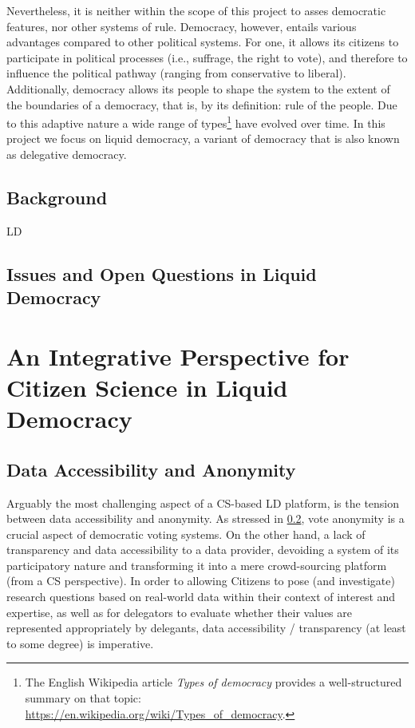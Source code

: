 Nevertheless, it is neither within the scope of this project to asses democratic features, nor other systems of rule. Democracy, however, entails various advantages compared to other political systems. For one, it allows its citizens to participate in political processes (i.e., suffrage, the right to vote), and therefore to influence the political pathway (ranging from conservative to liberal). Additionally, democracy allows its people to shape the system to the extent of the boundaries of a democracy, that is, by its definition: rule of the people. Due to this adaptive nature a wide range of types\footnote{The English Wikipedia article \textit{Types of democracy} provides a well-structured summary on that topic: \url{https://en.wikipedia.org/wiki/Types_of_democracy}.} have evolved over time. In this project we focus on liquid democracy, a variant of democracy that is also known as delegative democracy.


\subsection{Background}
\label{ssec:Background_LD}

\acrfull{LD} 

\subsection{Issues and Open Questions in Liquid Democracy}
\label{ssec:Issues_LD}
\section{An Integrative Perspective for Citizen Science in Liquid Democracy}
\label{sec:Integration_CSLD}

\subsection{Data Accessibility and Anonymity}
\label{ssec:Integration_AccessibilityAnonymity}
Arguably the most challenging aspect of a CS-based LD platform, is the tension between data accessibility and anonymity. As stressed  in \ref{ssec:Issues_LD}, vote anonymity is a crucial aspect of democratic voting systems. On the other hand, a lack of transparency and data accessibility  to a data provider, devoiding a system of its participatory nature and transforming it into a mere crowd-sourcing platform (from a CS perspective). In order to allowing Citizens to pose (and investigate) research questions based on real-world data within their context of interest and expertise, as well as for delegators to evaluate whether their values are represented appropriately by delegants, data accessibility / transparency (at least to some degree) is imperative.

